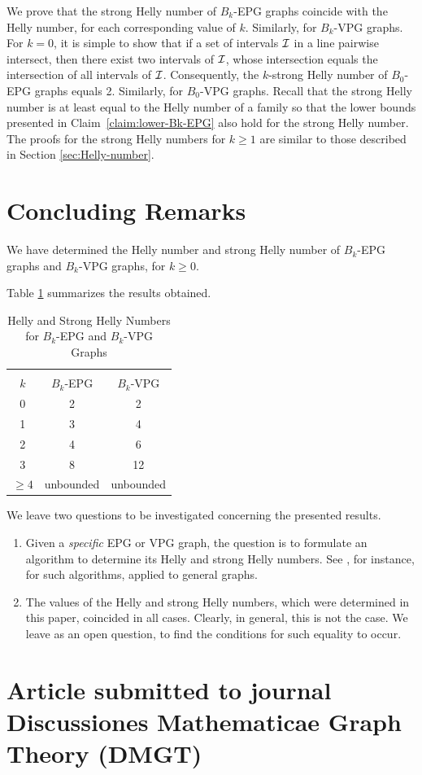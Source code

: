 We prove that the strong Helly number of $B_k$-EPG graphs coincide with the Helly number, for each corresponding value of $k$. Similarly, for $B_k$-VPG graphs. For $k=0$, it is simple to show that if a set of intervals $\cal I$ in a line pairwise intersect, then there exist two intervals of $\cal I$, whose intersection equals the intersection of all intervals of $\cal I$. Consequently, the $k$-strong Helly number of $B_0$-EPG graphs equals 2. 
Similarly, for $B_0$-VPG graphs. 
Recall that the strong Helly number is at least equal to the Helly number of a family so that the lower bounds presented in Claim~\ref{claim:lower-Bk-EPG} also hold for the strong Helly number. The proofs for the strong Helly numbers for $k \geq 1$ are similar to those described in Section \ref{sec:Helly-number}.  



\section{Concluding Remarks}\label{sec:concludingRemarks}
We have determined the Helly number and strong Helly number of $B_k$-EPG graphs and $B_k$-VPG graphs, for $k \geq 0$. 

Table \ref{tab:Helly-Strong-Helly} summarizes the results obtained.
 
\Large 

\begin{table}[htb]
    \centering
    \caption{Helly and Strong Helly Numbers for $B_k$-EPG and $B_k$-VPG Graphs}
    \label{tab:Helly-Strong-Helly}
    \begin{tabular}{c|c|c}
     \multicolumn{3}{c}{}\\
    \cline{1-3} $k$  & $B_k$-EPG & $B_k$-VPG \\
    \cline{1-3} 0 & 2 & 2 \\
    \cline{1-3} 1 & 3 & 4 \\
    \cline{1-3} 2 & 4 & 6 \\
    \cline{1-3} 3 & 8 & 12 \\
    \cline{1-3} $\geq 4$ & unbounded & unbounded \\
    \cline{1-3} 
    \end{tabular}
\end{table}

\normalsize

We leave two questions to be investigated concerning the presented results.

\begin{enumerate}
\item Given a {\it specific}  EPG or VPG graph, the question is to formulate an algorithm to determine its Helly and strong Helly numbers. See \cite{dourado2008improved}, for instance, for such algorithms, applied to general graphs. 

\item The values of the Helly and strong Helly numbers, which were determined in this paper, coincided in all cases. Clearly, in general, this is not the case. We leave as an open question, to find the conditions for such equality to occur. \end{enumerate}


\newpage


\section{Article submitted to journal  Discussiones Mathematicae Graph Theory (DMGT)} 
